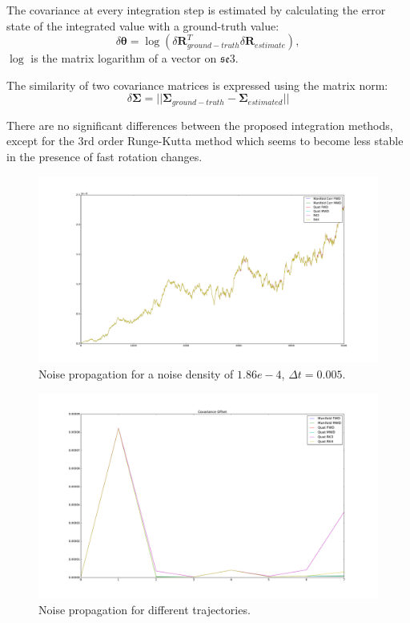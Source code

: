 \documentclass[10pt,a4paper]{article}
\newcommand{\mbs}[1]{{\boldsymbol{#1}}}
\numberwithin{equation}{section}
\begin{document}
The covariance at every integration step is estimated by calculating the error state of the integrated value with a ground-truth value:
\begin{equation}
\delta \mbs \theta = \log \left( \delta \mbs R_{ground-truth}^T \delta \mbs R_{estimate} \right),
\end{equation}
$\log$ is the matrix logarithm of a vector on $\mathfrak{se}3$.

The similarity of two covariance matrices is expressed using the matrix norm:
\begin{equation}
\delta \mbs \Sigma = || \mbs \Sigma_{ground-truth} - \mbs \Sigma_{estimated} ||
\end{equation}

There are no significant differences between the proposed integration methods, except for the $3$rd order Runge-Kutta method which seems to become less stable in the presence of fast rotation changes.

\begin{figure}
\includegraphics[width=14cm]{figures/covariance_offset.pdf}
\caption{Noise propagation for a noise density of $1.86e-4$, $\Delta t = 0.005$. }
\label{fig:rotation_drift_real}
\end{figure}	

\begin{figure}
\includegraphics[width=14cm]{figures/covariance_offset_methods.pdf}
\caption{Noise propagation for different trajectories.}
\label{fig:rotation_drift_real}
\end{figure}	
\end{document}
